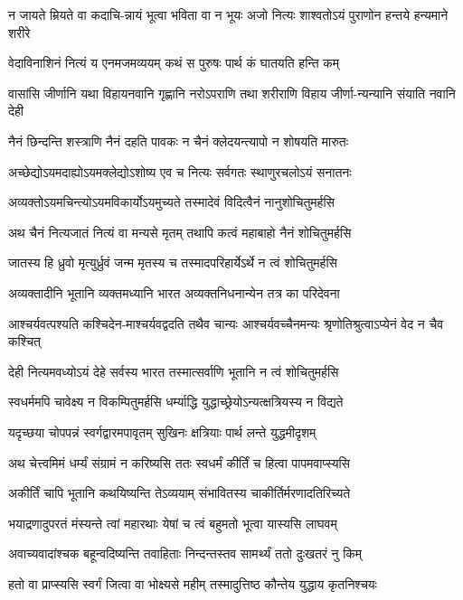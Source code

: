 \twolineshloka
{न जायते म्रियते वा कदाचि-न्नायं भूत्वा भविता वा न भूयः}
{अजो नित्यः शाश्वतोऽयं पुराणोन हन्तये हन्यमाने शरीरे}


\twolineshloka
{वेदाविनाशिनं नित्यं य एनमजमव्ययम्}
{कथं स पुरुषः पार्थ कं घातयति हन्ति कम्}


\twolineshloka
{वासांसि जीर्णानि यथा विहायनवानि गृह्णानि नरोऽपराणि}
{तथा शरीराणि विहाय जीर्णा-न्यन्यानि संयाति नवानि देही}


\twolineshloka
{नैनं छिन्दन्ति शस्त्राणि नैनं दहति पावकः}
{न चैनं क्लेदयन्त्यापो न शोषयति मारुतः}


\twolineshloka
{अच्छेद्योऽयमदाह्योऽयमक्लेद्योऽशोष्य एव च}
{नित्यः सर्वगतः स्थाणुरचलोऽयं सनातनः}


\twolineshloka
{अव्यक्तोऽयमचिन्त्योऽयमविकार्योऽयमुच्यते}
{तस्मादेवं विदित्वैनं नानुशोचितुमर्हसि}


\twolineshloka
{अथ चैनं नित्यजातं नित्यं वा मन्यसे मृतम्}
{तथापि कत्वं महाबाहो नैनं शोचितुमर्हसि}


\twolineshloka
{जातस्य हि ध्रुवो मृत्युर्ध्रुवं जन्म मृतस्य च}
{तस्मादपरिहार्येऽर्थे न त्वं शोचितुमर्हसि}


\twolineshloka
{अव्यक्तादीनि भूतानि व्यक्तमध्यानि भारत}
{अव्यक्तनिधनान्येन तत्र का परिदेवना}


\twolineshloka
{आश्चर्यवत्पश्यति कश्चिदेन-माश्चर्यवद्वदति तथैव चान्यः}
{आश्चर्यवच्चैनमन्यः श्रृणोतिश्रुत्वाऽप्येनं वेद न चैव कश्चित्}


\twolineshloka
{देही नित्यमवध्योऽयं देहे सर्वस्य भारत}
{तस्मात्सर्वाणि भूतानि न त्वं शोचितुमर्हसि}


\twolineshloka
{स्वधर्ममपि चावेक्ष्य न विकम्पितुमर्हसि}
{धर्म्याद्धि युद्धाच्छ्रेयोऽन्यत्क्षत्रियस्य न विद्यते}


\twolineshloka
{यदृच्छया चोपपन्नं स्वर्गद्वारमपावृतम्}
{सुखिनः क्षत्रियाः पार्थ लन्ते युद्धमीदृशम्}


\twolineshloka
{अथ चेत्त्वमिमं धर्म्यं संग्रामं न करिष्यसि}
{ततः स्वधर्मं कीर्तिं च हित्वा पापमवाप्स्यसि}


\twolineshloka
{अकीर्तिं चापि भूतानि कथयिष्यन्ति तेऽव्ययाम्}
{संभावितस्य चाकीर्तिर्मरणादतिरिच्यते}


\twolineshloka
{भयाद्रणादुपरतं मंस्यन्ते त्वां महारथाः}
{येषां च त्वं बहुमतो भूत्वा यास्यसि लाघवम्}


\twolineshloka
{अवाच्यवादांश्चक बहून्वदिष्यन्ति तवाहिताः}
{निन्दन्तस्तव सामर्थ्यं ततो दुःखतरं नु किम्}


\twolineshloka
{हतो वा प्राप्स्यसि स्वर्गं जित्वा वा भोक्ष्यसे महीम्}
{तस्मादुत्तिष्ठ कौन्तेय युद्धाय कृतनिश्चयः}


